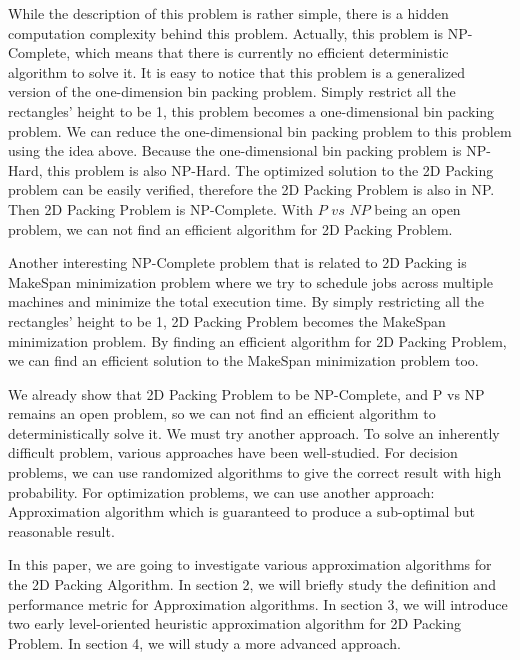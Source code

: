 \documentclass[sigplan,screen,nonacm]{acmart}\settopmatter{printfolios=true,printccs=false,printacmref=false}
\begin{document}
While the description of this problem is rather simple, there is a hidden computation complexity behind this problem. Actually, this problem is NP-Complete\cite{hartmanis1982computers}, which means that there is currently no efficient deterministic algorithm to solve it. It is easy to notice that this problem is a generalized version of the one-dimension bin packing problem\cite{johnson1974worst}. Simply restrict all the rectangles' height to be 1, this problem becomes a one-dimensional bin packing problem. We can reduce the one-dimensional bin packing problem to this problem using the idea above. Because the one-dimensional bin packing problem is NP-Hard, this problem is also NP-Hard. The optimized solution to the 2D Packing problem can be easily verified, therefore the 2D Packing Problem is also in NP. Then 2D Packing Problem is NP-Complete. With $P$ $vs$ $NP$ being an open problem, we can not find an efficient algorithm for 2D Packing Problem. \par
Another interesting NP-Complete problem that is related to 2D Packing is MakeSpan minimization problem\cite{graham1966bounds} where we try to schedule jobs across multiple machines and minimize the total execution time. By simply restricting all the rectangles' height to be 1, 2D Packing Problem becomes the MakeSpan minimization problem. By finding an efficient algorithm for 2D Packing Problem, we can find an efficient solution to the MakeSpan minimization problem too. \par
We already show that 2D Packing Problem to be NP-Complete, and P vs NP remains an open problem, so we can not find an efficient algorithm to deterministically solve it. We must try another approach. To solve an inherently difficult problem, various approaches have been well-studied. For decision problems, we can use randomized algorithms to give the correct result with high probability. For optimization problems, we can use another approach: Approximation algorithm\cite{garey1976approximation} which is guaranteed to produce a sub-optimal but reasonable result. \par
In this paper, we are going to investigate various approximation algorithms for the 2D Packing Algorithm. In section 2, we will briefly study the definition and performance metric for Approximation algorithms. In section 3, we will introduce two early level-oriented heuristic approximation algorithm\cite{coffman1980performance} for 2D Packing Problem. In section 4,  we will study a more advanced approach\cite{steinberg1997strip}.
\end{document}
